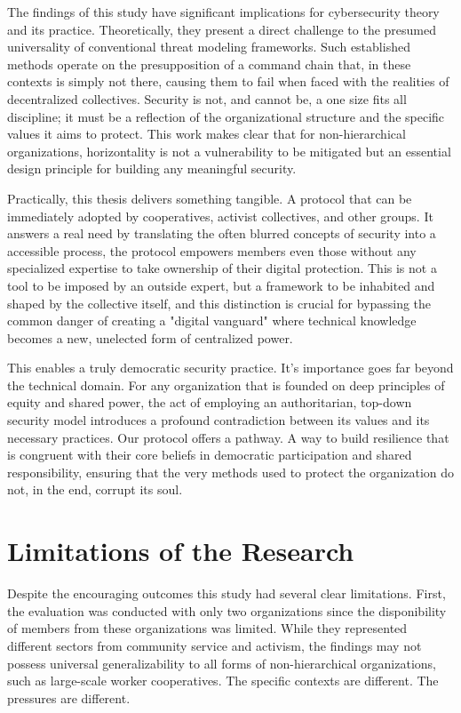 The findings of this study have significant implications for cybersecurity
theory and its practice. Theoretically, they present a direct
challenge to the presumed universality of conventional threat modeling
frameworks. Such established methods operate on the
presupposition of a command chain that, in these contexts is simply not there,
causing them to fail when faced with the realities of decentralized collectives.
Security is not, and cannot be, a one size fits all discipline; it must be a
reflection of the organizational structure and the specific values it aims to
protect. This work makes clear that for non-hierarchical organizations,
horizontality is not a vulnerability to be mitigated but an essential design
principle for building any meaningful security.

Practically, this thesis delivers something tangible. A protocol that can be
immediately adopted by cooperatives, activist collectives, and other groups.
It answers a real need by translating the often blurred concepts of
security into a accessible process, the protocol empowers
members even those without any specialized expertise to take ownership of
their digital protection. This is not a tool to be imposed by an
outside expert, but a framework to be inhabited and shaped by the collective
itself, and this distinction is crucial for bypassing the common danger of
creating a "digital vanguard" where technical knowledge becomes a new, unelected
form of centralized power.

This enables a truly democratic security practice. It's importance
goes far beyond the technical domain. For any organization that is founded on
deep principles of equity and shared power, the act of employing an
authoritarian, top-down security model introduces a profound contradiction
between its values and its necessary practices. Our protocol offers a pathway. A
way to build resilience that is congruent with their core beliefs in democratic
participation and shared responsibility, ensuring that the very methods used to
protect the organization do not, in the end, corrupt its soul.

\section{Limitations of the Research}
\label{sec:limitations-of-the-research}

Despite the encouraging outcomes this study had several clear
limitations. First, the evaluation was conducted with only two organizations
since the disponibility of members from these organizations was limited.
While they represented different sectors from community service and activism, the
findings may not possess universal generalizability to all forms of
non-hierarchical organizations, such as large-scale worker cooperatives. The specific
contexts are different. The pressures are different.


